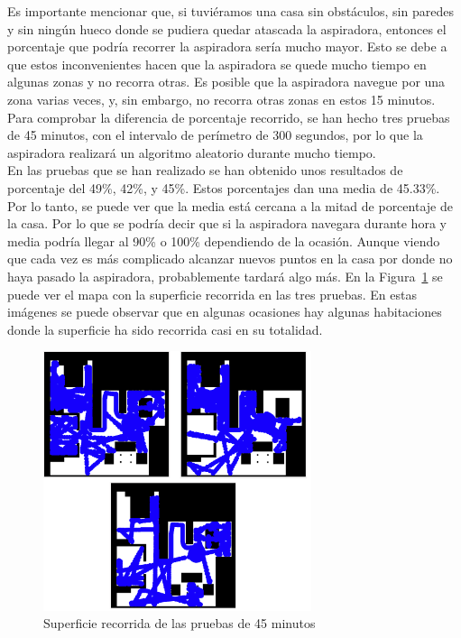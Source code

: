 Es importante mencionar que, si tuviéramos una casa sin obstáculos, sin paredes y sin ningún hueco donde se pudiera quedar atascada la aspiradora, entonces el porcentaje que podría recorrer la aspiradora sería mucho mayor. Esto se debe a que estos inconvenientes hacen que la aspiradora se quede mucho tiempo en algunas zonas y no recorra otras. Es posible que la aspiradora navegue por una zona varias veces, y, sin embargo, no recorra otras zonas en estos 15 minutos.\\

Para comprobar la diferencia de porcentaje recorrido, se han hecho tres pruebas de 45 minutos, con el intervalo de perímetro de 300 segundos, por lo que la aspiradora realizará un algoritmo aleatorio durante mucho tiempo. \\

En las pruebas que se han realizado se han obtenido unos resultados de porcentaje del 49\%, 42\%, y 45\%. Estos porcentajes dan una media de 45.33\%. Por lo tanto, se puede ver que la media está cercana a la mitad de porcentaje de la casa. Por lo que se podría decir que si la aspiradora navegara durante hora y media podría llegar al 90\% o 100\% dependiendo de la ocasión. Aunque viendo que cada vez es más complicado alcanzar nuevos puntos en la casa por donde no haya pasado la aspiradora, probablemente tardará algo más. En la Figura~\ref{fig.Referee_45MIN} se puede ver el mapa con la superficie recorrida en las tres pruebas. En estas imágenes se puede observar que en algunas ocasiones hay algunas habitaciones donde la superficie ha sido recorrida casi en su totalidad.\\

\begin{figure}[H]
  \begin{center}
    \includegraphics[width=0.7\textwidth]{figures/Vacuum/Referee_45MIN.png}
		\caption{Superficie recorrida de las pruebas de 45 minutos}
		\label{fig.Referee_45MIN}
		\end{center}
\end{figure}